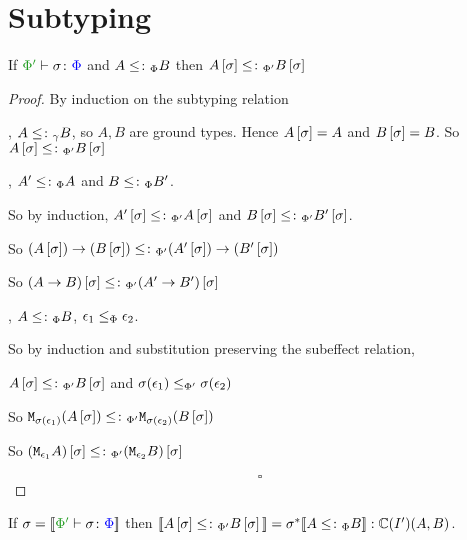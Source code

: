 \documentclass{report}
\begin{document}
\section{Subtyping}

\begin{theorem} 
    If $\typerelation{\P'}{\si}{\P}$ and $A\leq\colon_\Phi B$ then $A\left[\sigma\right]\leq\colon_{\Phi'} B\left[\sigma\right]$    
\end{theorem}
\begin{framed}
    \begin{proof}
        By induction on the subtyping relation
        
        \bi, $A\leq\colon_\gamma B$, so $A, B$ are ground types.
        Hence $A\left[\sigma\right] = A$ and $B\left[\sigma\right] = B$.
        So $A\left[\sigma\right]\leq\colon_{\Phi'} B\left[\sigma\right]$
        
        \bi, $A'\leq\colon_\Phi A$ and $B\leq\colon_\Phi B'$.
        
        So by induction, $A'\left[\sigma\right]\leq\colon_{\Phi'} A\left[\sigma\right]$ and $B\left[\sigma\right]\leq\colon_{\Phi'} B'\left[\sigma\right]$.
        
        So $(A\left[\sigma\right])\rightarrow (B\left[\sigma\right])\leq\colon_{\Phi'} (A'\left[\sigma\right])\rightarrow (B'\left[\sigma\right])$
        
        So $(A\rightarrow B)\left[\sigma\right]\leq\colon_{\Phi'} (A'\rightarrow B')\left[\sigma\right]$
        
        
        \bi, $A\leq\colon_\Phi B$, $\epsilon_1\leq_{\Phi}\epsilon_2$.
        
        So by induction and substitution preserving the subeffect relation, 
        
        $A\left[\sigma\right]\leq\colon_{\Phi'} B\left[\sigma\right]$ and $\sigma(\epsilon_1)\leq_{\Phi'}\sigma(\epsilon_2)$
        
        So $\texttt{M}_{\sigma(\epsilon_1)}{(A\left[\sigma\right])} \leq\colon_{\Phi'}\texttt{M}_{\sigma(\epsilon_2)}{(B\left[\sigma\right])}$
        
        So $(\texttt{M}_{\epsilon_1}{A})\left[\sigma\right] \leq\colon_{\Phi'}(\texttt{M}_{\epsilon_2}{B})\left[\sigma\right]$
        
        $$\square$$
    \end{proof}
    
\end{framed}

\begin{theorem}
    If $\si = \deno{\typerelation{\P'}{\si}{\P}}$ then ${\bf [\![}A\left[\sigma\right]\leq\colon_{\Phi'} B\left[\sigma\right]{\bf ]\!]} = \sigma^*{\bf [\![}A\leq\colon_\Phi B{\bf ]\!]}: \mathbb{C}(I')(A, B)$.    
\end{theorem}
\end{document}
